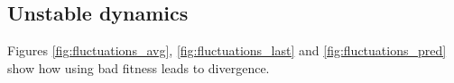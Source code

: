 \documentclass[12pt]{article}
\begin{document}
%


\newpage
\subsection*{Unstable dynamics}

Figures \ref{fig:fluctuations_avg}, \ref{fig:fluctuations_last} and \ref{fig:fluctuations_pred} show how using bad fitness leads to divergence.
\end{document}
